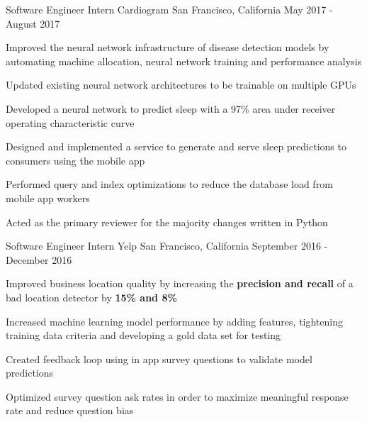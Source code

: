 


\begin{cventries}


\cventry
{Software Engineer Intern}
{Cardiogram}
{San Francisco, California}
{May 2017 - August 2017}
{ %
\begin{cvitems}
\item {Improved the neural network infrastructure of disease detection models by automating machine allocation, neural network training and performance analysis}
\item {Updated existing neural network architectures to be trainable on multiple GPUs}
\item {Developed a neural network to predict sleep with a 97\% area under receiver operating characteristic curve}
\item {Designed and implemented a service to generate and serve sleep predictions to consumers using the mobile app}
\item {Performed query and index optimizations to reduce the database load from mobile app workers}
\item {Acted as the primary reviewer for the majority changes written in Python}
\end{cvitems}
}


\cventry
{Software Engineer Intern}
{Yelp}
{San Francisco, California}
{September 2016 - December 2016}
{ %
\begin{cvitems}
\item {Improved business location quality by increasing the \textbf{precision and recall} of a bad location detector by \textbf{15\% and 8\%}}
\item {Increased machine learning model performance by adding features, tightening training data criteria and developing a gold data set for testing}
\item {Created feedback loop using in app survey questions to validate model predictions}
\item {Optimized survey question ask rates in order to maximize meaningful response rate and reduce question bias}
\end{cvitems}
}


\end{cventries}
